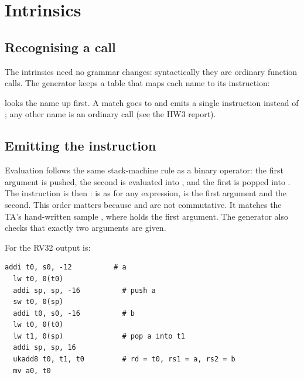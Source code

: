 \documentclass[12pt]{article}
\begin{document}

\section{Intrinsics}

\subsection{Recognising a call}

The intrinsics need no grammar changes: syntactically they are ordinary function calls. The generator keeps
a table that maps each name to its instruction:


 looks the name up first. A match goes to  and emits a single instruction
instead of ; any other name is an ordinary call (see the HW3 report).

\subsection{Emitting the instruction}


Evaluation follows the same stack-machine rule as a binary operator: the first argument is pushed, the
second is evaluated into , and the first is popped into . The instruction is then
:  is  as for any expression,  is the first argument and
 the second. This order matters because  and  are not commutative. It
matches the TA's hand-written sample , where  holds the first argument.
The generator also checks that exactly two arguments are given.

For  the RV32 output is:

\begin{lstlisting}[language=riscv,title={\codetitle{codegen.S (RV32), body of the function}}]
  addi t0, s0, -12          # a
  lw t0, 0(t0)
  addi sp, sp, -16          # push a
  sw t0, 0(sp)
  addi t0, s0, -16          # b
  lw t0, 0(t0)
  lw t1, 0(sp)              # pop a into t1
  addi sp, sp, 16
  ukadd8 t0, t1, t0         # rd = t0, rs1 = a, rs2 = b
  mv a0, t0
\end{lstlisting}
\end{document}
